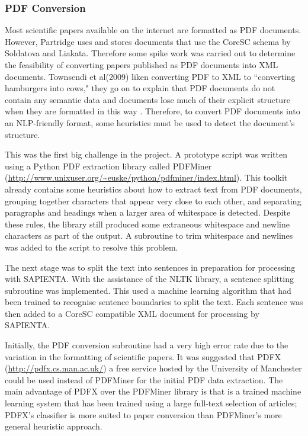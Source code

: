 \documentclass[12pt,a4paper]{article}
\begin{document}
\subsubsection{PDF Conversion}
Most scientific papers available on the internet are formatted as PDF
documents. However, Partridge uses and stores documents that use the CoreSC
schema by Soldatova and Liakata\cite{liakata2008guidelines}. Therefore some
spike work was carried out to determine the feasibility of converting papers
published as PDF documents into XML documents. Townsendi et al(2009) liken converting
PDF to XML to ``converting hamburgers into cows," they go on to explain that
PDF documents do not contain any semantic data and documents lose much of their
explicit structure when they are formatted in this way \cite{Townsend2009}.
Therefore, to convert PDF documents into an NLP-friendly format, some
heuristics must be used to detect the document's structure\cite{pdfminer}.

This was the first big challenge in the project. A prototype script was written
using a Python PDF extraction library called PDFMiner
(\url{http://www.unixuser.org/~euske/python/pdfminer/index.html}).  This
toolkit already contains some heuristics about how to extract text from PDF
documents, grouping together characters that appear very close to each other,
and separating paragraphs and headings when a larger area of whitespace is
detected\cite{pdfminer}. Despite these rules, the library still produced some
extraneous whitespace and newline characters as part of the output. A
subroutine to trim whitespace and newlines was added to the script to resolve
this problem. 

The next stage was to split the text into sentences in preparation for
processing with SAPIENTA. With the assistance of the NLTK library, a sentence
splitting subroutine was implemented. This used a machine learning algorithm
that had been trained to recognise sentence boundaries to split the text. Each
sentence was then added to a CoreSC compatible XML document for processing by
SAPIENTA.

Initially, the PDF conversion subroutine had a very high error rate due to the
variation in the formatting of scientific papers. It was suggested that PDFX
(\url{http://pdfx.cs.man.ac.uk/}) a free service hosted by the University of
Manchester could be used instead of PDFMiner for the initial PDF data
extraction. The main advantage of PDFX over the PDFMiner library is that is a
trained machine learning system that has been trained using a large full-text
selection of articles; PDFX's classifier is more suited to paper conversion
than PDFMiner's more general heuristic approach.
\end{document}
